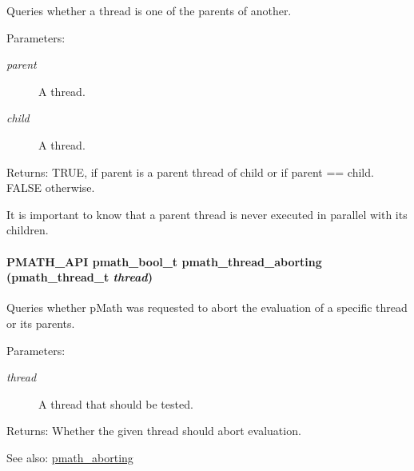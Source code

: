 Queries whether a thread is one of the parents of another. 

\begin{Desc}
\item[Parameters:]
\begin{description}
\item[{\em parent}]A thread. \item[{\em child}]A thread. \end{description}
\end{Desc}
\begin{Desc}
\item[Returns:]TRUE, if parent is a parent thread of child or if parent == child. FALSE otherwise.\end{Desc}
It is important to know that a parent thread is never executed in parallel with its children. \hypertarget{group__threads_g3932a5c364197c999dfab0aeb28e8779}{
\paragraph[{pmath\_\-thread\_\-aborting}]{\setlength{\rightskip}{0pt plus 5cm}PMATH\_\-API {\bf pmath\_\-bool\_\-t} pmath\_\-thread\_\-aborting ({\bf pmath\_\-thread\_\-t} {\em thread})}\hfill}
\label{group__threads_g3932a5c364197c999dfab0aeb28e8779}


Queries whether pMath was requested to abort the evaluation of a specific thread or its parents. 

\begin{Desc}
\item[Parameters:]
\begin{description}
\item[{\em thread}]A thread that should be tested. \end{description}
\end{Desc}
\begin{Desc}
\item[Returns:]Whether the given thread should abort evaluation.\end{Desc}
\begin{Desc}
\item[See also:]\hyperlink{group__threads_gb75a9c87401fddb42b297ddb0495415f}{pmath\_\-aborting} \end{Desc}
